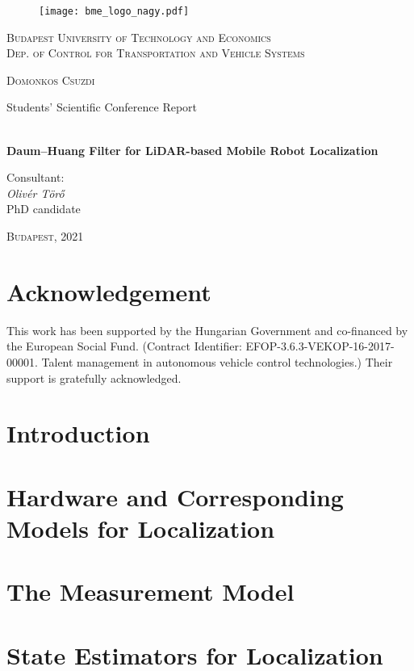 \documentclass[a4paper, 12pt]{paper}
\begin{document}
\begin{center}
    \begin{figure}[!h]
        \centering
        \texttt{[image: bme\_logo\_nagy.pdf]}
    \end{figure}
    \large\textsc{Budapest University of Technology and Economics\\
        Dep. of Control for Transportation
        and Vehicle Systems}
\end{center}
\thispagestyle{empty}
{\centering

    {\LARGE\textsc{Domonkos Csuzdi}

        \LARGE{Students' Scientific Conference Report}}

    {\Large\textbf{\\Daum--Huang Filter for LiDAR-based Mobile Robot Localization}}\\

    }

\begin{flushleft}
    \begin{minipage}{0.3\linewidth}
        \large{Consultant}:\\
        \forceindent \textit{Olivér Törő}\\
        \forceindent PhD candidate
    \end{minipage}
\end{flushleft}



\begin{center}
    {\Large\textsc{Budapest, }2021 }
\end{center}
\newpage
\thispagestyle{empty}
\newpage
\section*{Acknowledgement}
This work has been supported by the Hungarian Government and co-financed by the European Social Fund. (Contract Identifier: EFOP-3.6.3-VEKOP-16-2017-00001. Talent management in autonomous vehicle control technologies.) Their support is gratefully acknowledged.
\clearpage
\tableofcontents
\pagebreak
{}
\pagestyle{fancy}
\section{Introduction}

\section{Hardware and Corresponding Models for Localization}

\section{The Measurement Model}

\section{State Estimators for Localization}

\pagebreak

\end{document}
